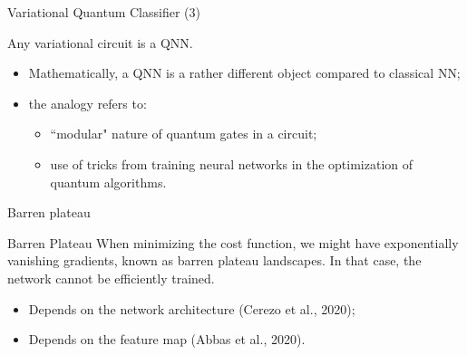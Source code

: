 \begin{frame}{Variational Quantum Classifier (3)}

Any variational circuit is a QNN. 
\begin{itemize}
    \item Mathematically, a QNN is a rather different object compared to classical NN;
    \item the analogy refers to:
    \begin{itemize}
        \item ``modular" nature of quantum gates in a circuit;
        \item use of tricks from training neural networks in the optimization of quantum algorithms.
    \end{itemize}
\end{itemize}

\begin{center}
\end{center}

\end{frame}


\begin{frame}{Barren plateau}

\begin{block}{Barren Plateau}
When minimizing the cost function, we might have exponentially vanishing gradients, known as barren plateau landscapes. In that case, the network cannot be efficiently trained.
\end{block}

\begin{itemize}
    \item Depends on the network architecture (Cerezo et al., 2020);
    \item Depends on the feature map (Abbas et al., 2020). 
\end{itemize}
\end{frame}


